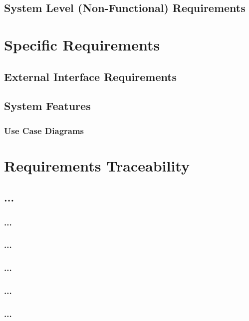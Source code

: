 \documentclass[12pt, oneside, letterpaper]{report}
\begin{document}
	\section{System Level (Non-Functional) Requirements}
		
\chapter{Specific Requirements}
	\section{External Interface Requirements}
		
	\section{System Features}
		\subsection{Use Case Diagrams}
		
		
		
		
		
		
		

\chapter{Requirements Traceability}
		\section{...}
			\subsection{...}
			\subsection{...}
			\subsection{...}
			\subsection{...}
			\subsection{...}
\end{document}
